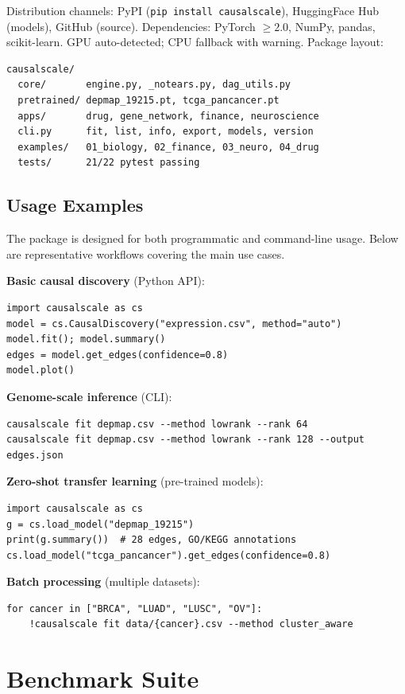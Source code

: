 \documentclass[sigconf,review]{acmart}
\begin{document}
Distribution channels: PyPI (\texttt{pip install causalscale}), HuggingFace Hub (models), GitHub (source). Dependencies: PyTorch $\ge2.0$, NumPy, pandas, scikit-learn. GPU auto-detected; CPU fallback with warning. Package layout:
\begin{verbatim}
causalscale/
  core/       engine.py, _notears.py, dag_utils.py
  pretrained/ depmap_19215.pt, tcga_pancancer.pt
  apps/       drug, gene_network, finance, neuroscience
  cli.py      fit, list, info, export, models, version
  examples/   01_biology, 02_finance, 03_neuro, 04_drug
  tests/      21/22 pytest passing
\end{verbatim}

\subsection{Usage Examples}

The package is designed for both programmatic and command-line usage. Below are representative workflows covering the main use cases.

\textbf{Basic causal discovery} (Python API):
\begin{verbatim}
import causalscale as cs
model = cs.CausalDiscovery("expression.csv", method="auto")
model.fit(); model.summary()
edges = model.get_edges(confidence=0.8)
model.plot()
\end{verbatim}

\textbf{Genome-scale inference} (CLI):
\begin{verbatim}
causalscale fit depmap.csv --method lowrank --rank 64
causalscale fit depmap.csv --method lowrank --rank 128 --output edges.json
\end{verbatim}

\textbf{Zero-shot transfer learning} (pre-trained models):
\begin{verbatim}
import causalscale as cs
g = cs.load_model("depmap_19215")
print(g.summary())  # 28 edges, GO/KEGG annotations
cs.load_model("tcga_pancancer").get_edges(confidence=0.8)
\end{verbatim}

\textbf{Batch processing} (multiple datasets):
\begin{verbatim}
for cancer in ["BRCA", "LUAD", "LUSC", "OV"]:
    !causalscale fit data/{cancer}.csv --method cluster_aware
\end{verbatim}

\section{Benchmark Suite}
\end{document}
